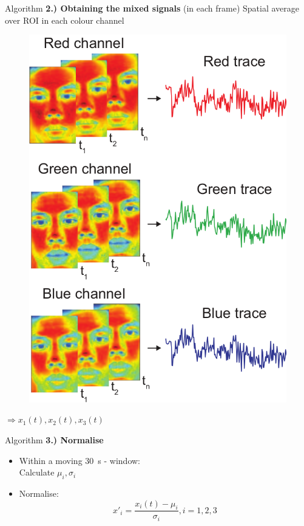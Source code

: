 \documentclass{beamer}
\begin{document}
\begin{frame}{Algorithm}
\textbf{\Large 2.) Obtaining the mixed signals} (in each frame)
	Spatial average over ROI in each colour channel
	\begin{figure}
	\includegraphics[height=0.6\paperheight, align=c]{video_to_trace.png}
	\end{figure}
	$\Rightarrow x_1(t), x_2(t), x_3(t)$
\end{frame}

\begin{frame}{Algorithm}
\textbf{\Large 3.) Normalise}
\begin{itemize}
	\item Within a moving 30~s - window:\\
		Calculate $\mu_i, \sigma_i$ \pause
	\item Normalise:
		\begin{equation*}
			x'_i = \frac{x_i(t) - \mu_i}{\sigma_i}, i = 1, 2, 3
		\end{equation*}
\end{itemize}
\end{frame}
\end{document}
